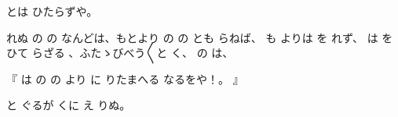 とは
ひたらずや。

れぬ
の
の
なんどは、もとより
の
の
とも
らねば、
も
よりは
を
れず、
は
を
ひて
らざる
、ふたゝびべう〳〵と
く、
の
は、

『
は
の
の
より
に
りたまへる
なるをや！。
』

と
ぐるが
くに
え
りぬ。

